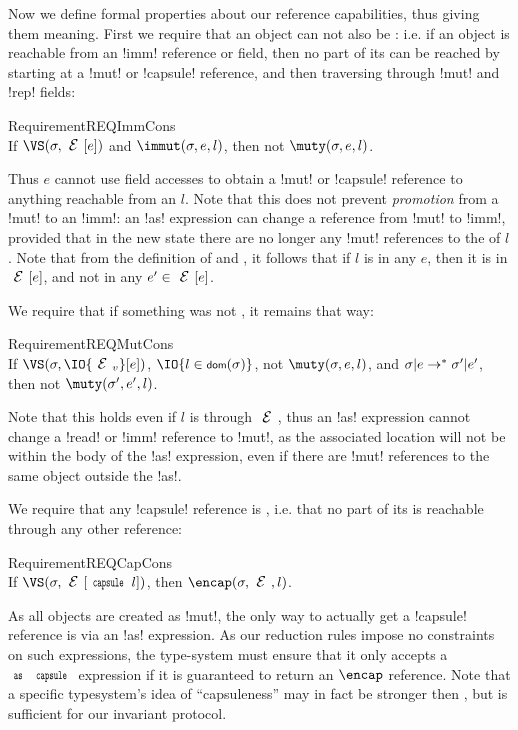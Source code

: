 Now we define formal properties about our reference capabilities, thus giving them meaning. First we require that
an \immut object can not also be \muty: i.e. if an object is reachable from an \Q!imm! reference or field, then no part of its \rog can be reached by starting at a \Q!mut! or \Q!capsule! reference, and then traversing through \Q!mut! and \Q!rep! fields:
\SS\begin{restatable}{Requirement}{REQImmCons}\ \\
	\indent If $\VS(\s, \E[e])$ and $\immut(\s, e, l)$, then not $\muty(\s, e, l)$.
\end{restatable}
\SS\noindent Thus $e$ cannot use field accesses to obtain a \Q!mut! or \Q!capsule! reference to anything reachable from an \immut $l$.
Note that this does not prevent \emph{promotion} from a \Q!mut! to an \Q!imm!: an \Q!as! expression can change a reference from \Q!mut! to \Q!imm!, provided that in the new state there are no longer any \Q!mut! references to the \rog of $l$. Note that from the definition of \muty and \immut, it follows that if $l$ is \immut in any $e$,
then it is \immut in $\E[e]$, and not \muty in any $e' \in \E[e]$.

\LS 

\noindent We require that if something was not \muty, it remains that way:%
\SS\begin{restatable}{Requirement}{REQMutCons}\ \\
	\indent If $\VS(\s, \IO{\EV}[e])$, $\IO{l \in \dom(\s)}$, not $\muty(\s, e, l)$, and $\sigma|e \rightarrow^{*} \sigma'|e'$, then not $\muty(\s', e', l)$.
\end{restatable}
\SS\noindent Note that this holds even if $l$ is \muty through $\E$, thus an \Q!as! expression cannot change a \Q!read! or \Q!imm! reference to \Q!mut!, as the associated location will not be \muty within the body of the \Q!as! expression, even if there are \Q!mut! references to the same object outside the \Q!as!.

\LS

We require that any \Q!capsule! reference is \encap, i.e. that no \muty part of its \rog is reachable through any other reference:%
\SS\begin{restatable}{Requirement}{REQCapCons}\ \\
\indent If $\VS(\s,\E[\Kw{capsule}\,l])$, then $\encap(\s, \E, l)$.
\end{restatable}%
\SS\noindent As all objects are created as \Q!mut!, the only way to actually get a \Q!capsule! reference is via an \Q!as! expression.
As our reduction rules impose no constraints on such expressions, the type-system must ensure that it only accepts a $\Kw{as}\,\Kw{capsule}$ expression if it is guaranteed to 
return an $\encap$ reference. Note that a specific typesystem's idea of ``capsuleness'' may in fact be stronger then \encap, but \encap is sufficient for our invariant protocol.

